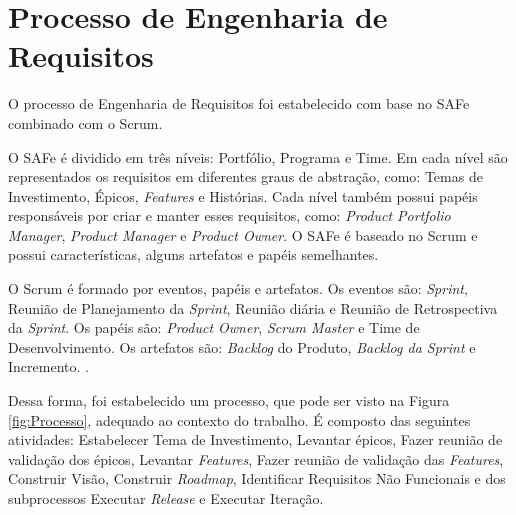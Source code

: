 \chapter[Processo de Engenharia de Requisitos]{Processo de Engenharia de Requisitos}

O processo de Engenharia de Requisitos foi estabelecido com base no SAFe combinado com o Scrum.

O SAFe é dividido em três níveis: Portfólio, Programa e Time. Em cada nível são representados os requisitos
em diferentes graus de abstração, como: Temas de Investimento, Épicos, \textit{Features} e Histórias.
Cada nível também possui papéis responsáveis por criar e manter esses requisitos, como: \textit{Product Portfolio Manager}, 
\textit{Product Manager} e \textit{Product Owner}. O SAFe é baseado no Scrum e
possui características, alguns artefatos e papéis semelhantes. \cite{safe}

% 

O Scrum é formado por eventos, papéis e artefatos. Os eventos são: \textit{Sprint}, Reunião de Planejamento
da \textit{Sprint}, Reunião diária e Reunião de Retrospectiva da \textit{Sprint}. Os papéis são: \textit{Product Owner},
\textit{Scrum Master} e Time de Desenvolvimento. Os artefatos são: \textit{Backlog} do Produto, \textit{Backlog da Sprint} e Incremento. \cite{scrum}.
% 


Dessa forma, foi estabelecido um processo, que pode ser visto na Figura \ref{fig:Processo}, adequado ao contexto do trabalho.
É composto das seguintes atividades: Estabelecer Tema de Investimento, Levantar épicos, Fazer reunião de validação dos épicos, 
Levantar \textit{Features}, Fazer reunião de validação das \textit{Features}, Construir Visão, Construir \textit{Roadmap}, Identificar Requisitos Não Funcionais e dos 
subprocessos Executar \textit{Release} e Executar Iteração.

